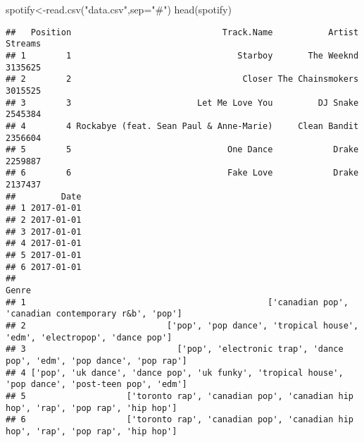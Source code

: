 \documentclass[
]{article}
\newenvironment{Shaded}{\begin{snugshade}}{\end{snugshade}}
\newcommand{\AttributeTok}[1]{\textcolor[rgb]{0.77,0.63,0.00}{#1}}
\newcommand{\DecValTok}[1]{\textcolor[rgb]{0.00,0.00,0.81}{#1}}
\newcommand{\FunctionTok}[1]{\textcolor[rgb]{0.00,0.00,0.00}{#1}}
\newcommand{\NormalTok}[1]{#1}
\newcommand{\OtherTok}[1]{\textcolor[rgb]{0.56,0.35,0.01}{#1}}
\newcommand{\SpecialCharTok}[1]{\textcolor[rgb]{0.00,0.00,0.00}{#1}}
\newcommand{\StringTok}[1]{\textcolor[rgb]{0.31,0.60,0.02}{#1}}
\begin{document}
\begin{Shaded}
\begin{Highlighting}[]
\NormalTok{spotify}\OtherTok{\textless{}{-}}\FunctionTok{read.csv}\NormalTok{(}\StringTok{"data.csv"}\NormalTok{,}\AttributeTok{sep=}\StringTok{"\#"}\NormalTok{)}
\FunctionTok{head}\NormalTok{(spotify)}
\end{Highlighting}
\end{Shaded}

\begin{verbatim}
##   Position                              Track.Name           Artist Streams
## 1        1                                 Starboy       The Weeknd 3135625
## 2        2                                  Closer The Chainsmokers 3015525
## 3        3                         Let Me Love You         DJ Snake 2545384
## 4        4 Rockabye (feat. Sean Paul & Anne-Marie)     Clean Bandit 2356604
## 5        5                               One Dance            Drake 2259887
## 6        6                               Fake Love            Drake 2137437
##         Date
## 1 2017-01-01
## 2 2017-01-01
## 3 2017-01-01
## 4 2017-01-01
## 5 2017-01-01
## 6 2017-01-01
##                                                                                                 Genre
## 1                                                ['canadian pop', 'canadian contemporary r&b', 'pop']
## 2                            ['pop', 'pop dance', 'tropical house', 'edm', 'electropop', 'dance pop']
## 3                              ['pop', 'electronic trap', 'dance pop', 'edm', 'pop dance', 'pop rap']
## 4 ['pop', 'uk dance', 'dance pop', 'uk funky', 'tropical house', 'pop dance', 'post-teen pop', 'edm']
## 5                    ['toronto rap', 'canadian pop', 'canadian hip hop', 'rap', 'pop rap', 'hip hop']
## 6                    ['toronto rap', 'canadian pop', 'canadian hip hop', 'rap', 'pop rap', 'hip hop']
\end{verbatim}

\begin{Shaded}
\end{Shaded}
\end{document}
